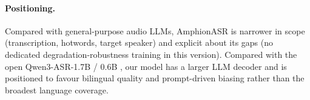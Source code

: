 \paragraph{Positioning.}
Compared with general-purpose audio LLMs, AmphionASR is narrower in
scope (transcription, hotwords, target speaker) and explicit about its
gaps (no dedicated degradation-robustness training in this version). Compared
with the open Qwen3-ASR-1.7B / 0.6B \cite{qwen2025qwen3asr}, our model
has a larger LLM decoder and is positioned to favour bilingual quality
and prompt-driven biasing rather than the broadest language coverage.
